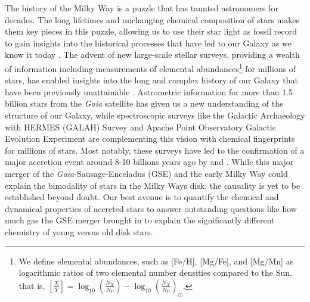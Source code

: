 \documentclass[fleqn,usenatbib]{mnras}
\newcommand{\Gaia}{\textit{Gaia}\xspace} %
\begin{document}
The history of the Milky Way is a puzzle that has taunted astronomers for decades. The long lifetimes and unchanging chemical composition of stars makes them key pieces in this puzzle, allowing us to use their star light as fossil record to gain insights into the historical processes that have led to our Galaxy as we know it today \citep{FreemanBlandHawthorn2002}. The advent of new large-scale stellar surveys, providing a wealth of information including measurements of elemental abundances\footnote{We define elemental abundances, such as [Fe/H], [Mg/Fe], and [Mg/Mn] as logarithmic ratios of two elemental number densities compared to the Sun, that is, $\left[\frac{X}{Y}\right]=\log_{10}\left(\frac{N_X}{N_Y}\right) -\log_{10}\left(\frac{N_X}{N_Y}\right)_\odot$.} for millions of stars, has enabled insights into the long and complex history of our Galaxy that have been previously unattainable \citep{Jofre2019}. Astrometric information for more than 1.5 billion stars from the \Gaia satellite \citep{Brown2016,Brown2018,Brown2021} has given us a new understanding of the structure of our Galaxy, while spectroscopic surveys like the Galactic Archaeology with HERMES (GALAH) Survey \citep{daSilva2015} and Apache Point Observatory Galactic Evolution Experiment \citep[APOGEE][]{Majewski2016} are complementing this vision with chemical fingerprints for millions of stars. Most notably, these surveys have led to the confirmation of a major accretion event around 8-10 billions years ago by \citet{Belokurov2018} and \citet{Helmi2018}. While this major merger of the \Gaia-Sausage-Enceladus (GSE) and the early Milky Way could explain the bimodality of stars in the Milky Ways disk, the causality is yet to be established beyond doubt. Our best avenue is to quantify the chemical and dynamical properties of accreted stars to answer outstanding questions like how much gas the GSE merger brought in to explain the significantly different chemistry of young versus old disk stars.

\end{document}
